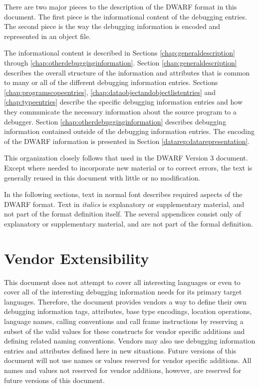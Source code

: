 There are two major pieces to the description of the DWARF
format in this document. The first piece is the informational
content of the debugging entries. The second piece is the
way the debugging information is encoded and represented in
an object file.

The informational content is described in 
Sections \ref{chap:generaldescription} 
through
\ref{chap:otherdebugginginformation}. 
Section  \ref{chap:generaldescription}
describes the overall structure of the information
and attributes that is common to many or all of the different
debugging information entries. 
Sections \ref{chap:programscopeentries}, 
\ref{chap:dataobjectandobjectlistentries} and 
\ref{chap:typeentries} describe
the specific debugging information entries and how they
communicate the necessary information about the source program
to a debugger. 
Section \ref{chap:otherdebugginginformation} 
describes debugging information
contained outside of the debugging information entries. The
encoding of the DWARF information is presented in 
Section \ref{datarep:datarepresentation}.

This organization closely follows that used in the DWARF
Version 3 document. Except where needed to incorporate
new material or to correct errors, the 
text is generally reused in this document with little or
no modification.

In the following sections, text in normal font describes
required aspects of the DWARF format.  Text in \textit{italics} is
explanatory or supplementary material, and not part of the
format definition itself. The several appendices consist only
of explanatory or supplementary material, and are not part
of the formal definition.
\section{Vendor Extensibility}

This document does not attempt to cover all interesting
languages or even to cover all of the interesting debugging
information needs for its primary target languages. 
Therefore,
the document provides vendors a way to define their own
debugging information tags, attributes, base type encodings,
location operations, language names, calling conventions and
call frame instructions by reserving a subset of the valid
values for these constructs for vendor specific additions
and defining related naming conventions. 
Vendors may also use
debugging information entries and attributes defined here in
new situations. 
Future versions of this document will not use
names or values reserved for vendor specific additions. 
All
names and values not reserved for vendor additions, however,
are reserved for future versions of this document.

